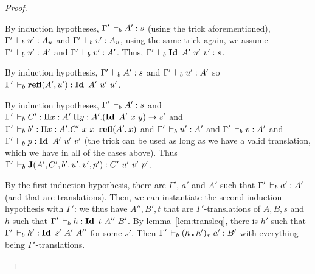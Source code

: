 \documentclass[a4paper,english]{lipics-utf8x}
\begin{document}
\begin{proof}
\begin{caselist}
      \begin{graycase}
        \begin{mathc}
        \end{mathc}
        By induction hypotheses, $\Gamma' \,\vdash_b A' : s$ (using the trick
        aforementioned), $\Gamma' \,\vdash_b u' : A_u$ and $\Gamma' \,\vdash_b v' : A_v$,
        using the same trick again, we assume $\Gamma' \,\vdash_b u' : A'$ and
        $\Gamma' \,\vdash_b v' : A'$.
        Thus, $\Gamma' \,\vdash_b \operatorname{\mathbf{Id}~} A'\ u'\ v' : s$.
      \end{graycase}

      \begin{graycase}
        \begin{mathc}
        \end{mathc}
        By induction hypothesis, $\Gamma' \,\vdash_b A' : s$ and
        $\Gamma' \,\vdash_b u' : A'$ so
        $\Gamma' \derb \refl(A',u') : \Id A'\ u'\ u'$.
      \end{graycase}

      \begin{graycase}
        \begin{mathc}
        \end{mathc}
        By induction hypotheses, $\Gamma' \,\vdash_b A' : s$ and
        $\Gamma' \,\vdash_b C' : \Pi x:A'. \Pi y:A'. (\operatorname{\mathbf{Id}~} A'\ x\ y) \to s'$ and
        $\Gamma' \derb b' : \Pi x:A'. C'\ x\ x\ \refl(A',x)$ and
        $\Gamma' \,\vdash_b u' : A'$ and $\Gamma' \,\vdash_b v : A'$ and
        $\Gamma' \,\vdash_b p : \operatorname{\mathbf{Id}~} A'\ u'\ v'$ (the trick can be used as long as we
        have a valid translation, which we have in all of the cases above).
        Thus $\Gamma' \,\vdash_b \operatorname{\mathbf{J}}(A',C',b',u',v',p') : C'\ u'\ v'\ p'$.
      \end{graycase}

      \nextcase
      \begin{mathc}
      \end{mathc}
      By the first induction hypothesis, there are $\Gamma'$, $a'$ and $A'$
      such that $\Gamma' \,\vdash_b a' : A'$ (and that are translations).
      Then, we can instantiate the second induction hypothesis with $\Gamma'$:
      we thus have $A'',B',t$ that are $\Gamma'$-translations of $A,B,s$ and
      $h$ such that $\Gamma' \derb h : \Id t\ A''\ B'$.
      By lemma~\ref{lem:transleq}, there is $h'$ such that
      $\Gamma' \derb h' : \Id s'\ A'\ A''$ for some $s'$.
      Then $\Gamma' \,\vdash_b (h \centerdot h')_*\ a' : B'$ with everything being
      $\Gamma'$-translations.


\end{caselist}
\end{proof}
\end{document}

